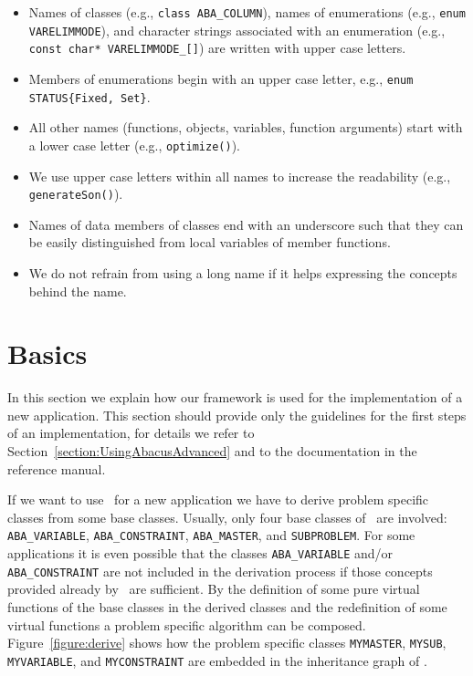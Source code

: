 \begin{itemize}
\item  Names of classes (e.g., {\tt class ABA\_COLUMN}), 
       names of enumerations (e.g., {\tt enum VARELIMMODE}), 
       and character strings associated with an enumeration
       (e.g., {\tt const char* VARELIMMODE\_[]})       
       are written with upper case letters.

\item  Members of enumerations begin with an upper case letter,
       e.g., {\tt enum STATUS\{Fixed, Set\}}.

\item All other names (functions, objects, variables, function
         arguments) start with a lower case letter
         (e.g., {\tt optimize()}).

\item We use upper case letters within all names to increase the
      readability (e.g., {\tt generateSon()}).

\item Names of data members of classes end with an underscore
          such that they can be easily distinguished from local
          variables of member functions.

\item We do not refrain from using a long name if it helps
      expressing the concepts behind the name.
\end{itemize}


\section{Basics}
\label{section:UsingAbacusBasics}

In this section we explain how our framework is used for the implementation
of a new application. 
This section should provide only the guidelines for the first steps
of an implementation, for
details we refer to Section~\ref{section:UsingAbacusAdvanced}
and to the documentation in the reference manual.

If we want to use \ABACUS\ for a new application we have to derive problem
specific classes from some base classes. Usually, only four base classes
of \ABACUS\ are involved: {\tt ABA\_VARIABLE}, {\tt ABA\_CONSTRAINT}, 
{\tt ABA\_MASTER}, and {\tt SUBPROBLEM}. For some applications it is
even possible that the classes {\tt ABA\_VARIABLE} and/or {\tt ABA\_CONSTRAINT}
are not included in the derivation process if those concepts
provided already by \ABACUS\ are sufficient. By the definition of some
pure virtual functions of the base classes in the derived classes and
the redefinition of some virtual functions a problem specific algorithm
can be composed. Figure~\ref{figure:derive} shows how the problem
specific classes {\tt MYMASTER}, {\tt MYSUB}, {\tt MYVARIABLE}, and
{\tt MYCONSTRAINT} are embedded in the inheritance graph of \ABACUS.

